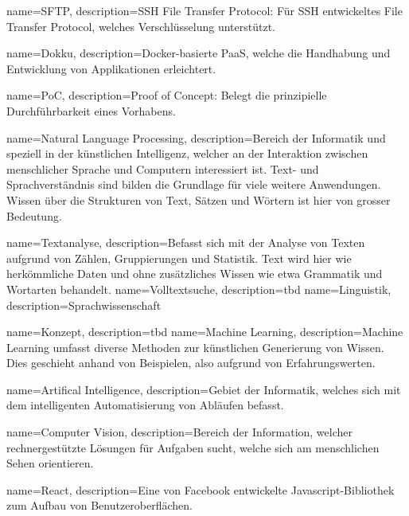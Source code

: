 {
    name=SFTP,
    description={SSH File Transfer Protocol: Für SSH entwickeltes File Transfer Protocol, welches Verschlüsselung unterstützt.}
}

{
    name=Dokku,
    description={Docker-basierte PaaS, welche die Handhabung und Entwicklung von Applikationen erleichtert.}
}

{
    name=PoC,
    description={Proof of Concept: Belegt die prinzipielle Durchführbarkeit eines Vorhabens.}
}

{
    name=Natural Language Processing,
    description={Bereich der Informatik und speziell in der künstlichen Intelligenz, welcher an der Interaktion zwischen menschlicher Sprache und Computern interessiert ist. Text- und Sprachverständnis sind bilden die Grundlage für viele weitere Anwendungen. Wissen über die Strukturen von Text, Sätzen und Wörtern ist hier von grosser Bedeutung.}
}

{
    name=Textanalyse,
    description={Befasst sich mit der Analyse von Texten aufgrund von Zählen, Gruppierungen und Statistik. Text wird hier wie herkömmliche Daten und ohne zusätzliches Wissen wie etwa Grammatik und Wortarten behandelt.}
}
{
    name=Volltextsuche,
    description={tbd}
}
{
    name=Linguistik,
    description={Sprachwissenschaft}
}

{
    name=Konzept,
    description={tbd}
}
{
    name=Machine Learning,
    description={Machine Learning umfasst diverse Methoden zur künstlichen Generierung von Wissen. Dies geschieht anhand von Beispielen, also aufgrund von Erfahrungswerten.}
}

{
    name=Artifical Intelligence,
    description={Gebiet der Informatik, welches sich mit dem intelligenten Automatisierung von Abläufen befasst.}
}

{
    name=Computer Vision,
    description={Bereich der Information, welcher rechnergestützte Lösungen für Aufgaben sucht, welche sich am menschlichen Sehen orientieren.}
}

{
    name=React,
    description={Eine von Facebook entwickelte Javascript-Bibliothek zum Aufbau von Benutzeroberflächen.}
}


